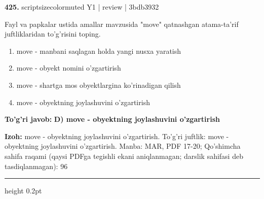 \documentclass[10pt,a4paper]{article}
\begin{document}
{\bfseries\sffamily\color{ink} 425.} {scriptsizecolor{muted} Y1 | review | 3bdb3932}
\par
Fayl va papkalar ustida amallar mavzusida "move" qatnashgan atama-ta'rif juftliklaridan to'g'risini toping.
\begin{enumerate}[label=\Alph*),leftmargin=9mm]
\item move - manbani saqlagan holda yangi nusxa yaratish
\item move - obyekt nomini o'zgartirish
\item move - shartga mos obyektlargina ko'rinadigan qilish
\item move - obyektning joylashuvini o'zgartirish
\end{enumerate}
\begin{tcolorbox}[enhanced,breakable,colback=teal!4,colframe=teal!60!black,boxrule=0.45pt,arc=1.2mm,left=2.7mm,right=2.7mm,top=1.8mm,bottom=1.8mm,before skip=2mm,after skip=2mm]
{\bfseries\sffamily\color{teal}To'g'ri javob:} \textbf{D) move - obyektning joylashuvini o'zgartirish}
\par\smallskip
{\bfseries Izoh:} move - obyektning joylashuvini o'zgartirish. To'g'ri juftlik: move - obyektning joylashuvini o'zgartirish. Manba: MAR, PDF 17-20; Qo'shimcha sahifa raqami (qaysi PDFga tegishli ekani aniqlanmagan; darslik sahifasi deb tasdiqlanmagan): 96
\end{tcolorbox}
\vspace{2mm}\hrule height 0.2pt\vspace{3mm}
\end{document}
